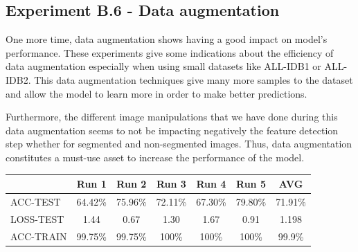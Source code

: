 \documentclass[11pt, openany]{report}
\theoremstyle{plain}
\theoremstyle{definition}
\theoremstyle{remark}
\begin{document}
\subsection{Experiment B.6 - Data augmentation}

One more time, data augmentation shows having a good impact on model's performance. These experiments give some indications about the efficiency of data augmentation especially when using small datasets like ALL-IDB1 or ALL-IDB2. This data augmentation techniques give many more samples to the dataset and allow the model to learn more in order to make better predictions. 

Furthermore, the different image manipulations that we have done during this data augmentation seems to not be impacting negatively the feature detection step whether for segmented and non-segmented images. Thus, data augmentation constitutes a must-use asset to increase the performance of the model.  

\begin{center}
\begin{tabular}{|l|c|c|c|c|c|c|}
  \hline
   & \textbf{Run 1} & \textbf{Run 2} & \textbf{Run 3} & \textbf{Run 4} & \textbf{Run 5} & \textbf{AVG}\\
  \hline
  ACC-TEST & 64.42\% & 75.96\% & 72.11\% & 67.30\% & 79.80\% & 71.91\% \\
  LOSS-TEST & 1.44 & 0.67 & 1.30 & 1.67 & 0.91 & 1.198 \\ 
  ACC-TRAIN & 99.75\% & 99.75\% & 100\% & 100\% & 100\% & 99.9\% \\ 
  \hline
\end{tabular}
\label{table:results-B6}
\end{center}
\end{document}
